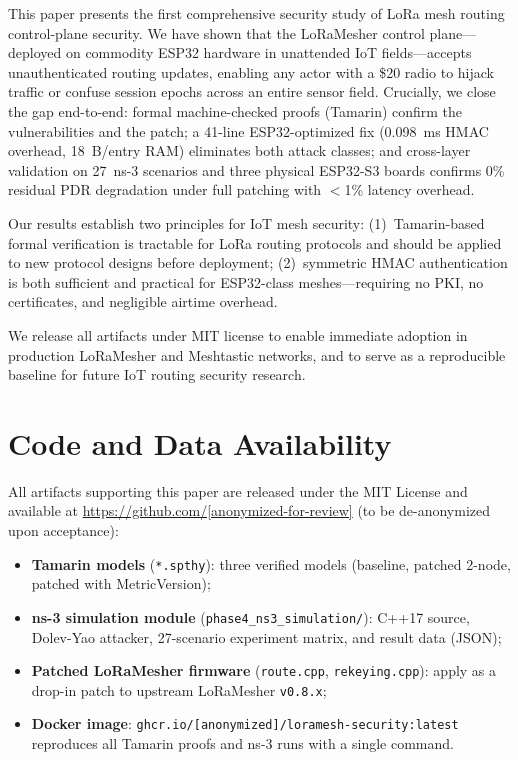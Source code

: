 \documentclass[10pt,journal,compsoc]{IEEEtran}
\begin{document}
This paper presents the first comprehensive security study of LoRa
mesh routing control-plane security. We have shown that
the LoRaMesher control plane—deployed on commodity ESP32 hardware
in unattended IoT fields—accepts unauthenticated routing updates,
enabling any actor with a \$20 radio to hijack traffic or confuse
session epochs across an entire sensor field. Crucially, we close
the gap end-to-end: formal machine-checked proofs (Tamarin) confirm
the vulnerabilities and the patch; a 41-line ESP32-optimized fix
(0.098~ms HMAC overhead, 18~B/entry RAM) eliminates both attack
classes; and cross-layer validation on 27~ns-3 scenarios and three
physical ESP32-S3 boards confirms 0\% residual PDR degradation
under full patching with $<$1\% latency overhead.

Our results establish two principles for IoT mesh security:
(1)~Tamarin-based formal verification is tractable for LoRa
routing protocols and should be applied to new protocol designs
before deployment; (2)~symmetric HMAC authentication is both
sufficient and practical for ESP32-class meshes—requiring no PKI,
no certificates, and negligible airtime overhead.

We release all artifacts under MIT license to enable immediate
adoption in production LoRaMesher and Meshtastic networks, and
to serve as a reproducible baseline for future IoT routing
security research.

\section*{Code and Data Availability}

All artifacts supporting this paper are released under the MIT License
and available at \url{https://github.com/[anonymized-for-review]}
(to be de-anonymized upon acceptance):

\begin{itemize}
  \item \textbf{Tamarin models} (\texttt{*.spthy}):
    three verified models (baseline, patched 2-node, patched with MetricVersion);
  \item \textbf{ns-3 simulation module} (\texttt{phase4\_ns3\_simulation/}):
    C++17 source, Dolev-Yao attacker, 27-scenario experiment matrix, and
    result data (JSON);
  \item \textbf{Patched LoRaMesher firmware} (\texttt{route.cpp},
    \texttt{rekeying.cpp}): apply as a drop-in patch to upstream
    LoRaMesher \texttt{v0.8.x};
  \item \textbf{Docker image}:
    \texttt{ghcr.io/[anonymized]/loramesh-security:latest}
    reproduces all Tamarin proofs and ns-3 runs with a single command.
\end{itemize}
\end{document}

